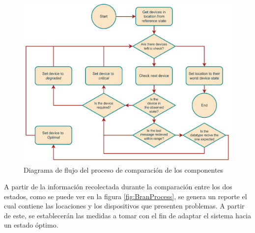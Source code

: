 \begin{figure}[H]
    \centering
    \caption{Diagrama de flujo del proceso de comparación de los componentes}
    \label{fig:BranCompare}
    \includegraphics[width=\linewidth]{images/BranCompare.pdf}
\end{figure}

A partir de la información recolectada durante la comparación entre los dos estados, como se puede ver en la figura \ref{fig:BranProcess}, se genera un reporte el cual contiene las locaciones y los dispositivos que presenten problemas. A partir de este, se establecerán las medidas a tomar con el fin de adaptar el sistema hacia un estado óptimo.

